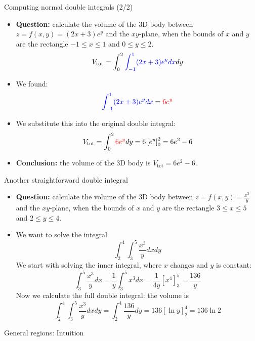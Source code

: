\begin{frame}{Computing normal double integrals (2/2)}
    \begin{itemize}
        \item \textbf{Question:} calculate the volume of the 3D body between $z=f(x,y)=(2x+3)e^y$ and the $xy$-plane, when the bounds of $x$ and $y$ are the rectangle $-1\leq x\leq1$ and $0\leq y\leq2$.
            \[V_{\text{tot}}=\int_{0}^{2}\textcolor{blue}{\int_{-1}^{1}(2x+3)e^y dx}dy\]
        \item We found:
            \[\textcolor{blue}{\int_{-1}^{1}(2x+3)e^y dx}=\textcolor{red}{6e^y}\]
        \item We substitute this into the original double integral:
            \[V_{\text{tot}}=\int_{0}^{2}\textcolor{red}{6e^y}dy=6\left[e^y\right]_0^2=6e^2-6\]
        \item \textbf{Conclusion:} the volume of the 3D body is $\boxed{V_{\text{tot}}=6e^2-6}$.
    \end{itemize}
\end{frame}


\begin{frame}{Another straightforward double integral}
    \begin{itemize}
        \item \textbf{Question:} calculate the volume of the 3D body between $z=f(x,y)=\frac{x^3}{y}$ and the $xy$-plane, when the bounds of $x$ and $y$ are the rectangle $3\leq x\leq5$ and $2\leq y\leq4$.
        \item We want to solve the integral
            \[\int_2^4\int_3^5\frac{x^3}{y}dxdy\]
            We start with solving the inner integral, where $x$ changes and $y$ is constant:
            \[\int_3^5\frac{x^3}{y}dx=\frac{1}{y}\int_3^5x^3dx=\frac{1}{4y}\left[x^4\right]_3^5=\frac{136}{y}\]
            Now we calculate the full double integral: the volume is
            \[\int_2^4\int_3^5\frac{x^3}{y}dxdy=\int_2^4\frac{136}{y}dy=136\left[\ln y\right]_2^4=\boxed{136\ln2}\]
    \end{itemize}
\end{frame}

\begin{frame}{General regions: Intuition}
    

\end{frame}

